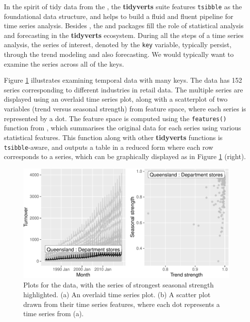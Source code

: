 In the spirit of tidy data from the 
\citep{Wickham2019}, the \textbf{tidyverts} suite features
\texttt{tsibble} as the foundational data structure, and helps to build
a fluid and fluent pipeline for time series analysis. Besides
, the  \citep{R-feasts} and
 \citep{R-fable} packages fill the role of statistical
analysis and forecasting in the \textbf{tidyverts} ecosystem. During all
the steps of a time series analysis, the series of interest, denoted by
the \texttt{key} variable, typically persist, through the trend modeling
and also forecasting. We would typically want to examine the series
across all of the keys.

Figure \ref{fig:highlight-retail} illustrates examining temporal data
with many keys. The data has 152 series corresponding to different
industries in retail data. The multiple series are displayed using an
overlaid time series plot, along with a scatterplot of two variables
(trend versus seasonal strength) from feature space, where each series
is represented by a dot. The feature space is computed using the
\texttt{features()} function from , which summarises the
original data for each series using various statistical features. This
function along with other \textbf{tidyverts} functions is
\texttt{tsibble}-aware, and outputs a table in a reduced form where each
row corresponds to a series, which can be graphically displayed as in
Figure \ref{fig:highlight-retail} (right).

\begin{Schunk}
\begin{figure}

{\centering \includegraphics[width=\textwidth]{figure/highlight-retail-1} 

}

\caption[Plots for the  data, with the series of strongest seasonal strength highlighted]{Plots for the  data, with the series of strongest seasonal strength highlighted. (a) An overlaid time series plot. (b) A scatter plot drawn from their time series features, where each dot represents a time series from (a).}\label{fig:highlight-retail}
\end{figure}
\end{Schunk}

